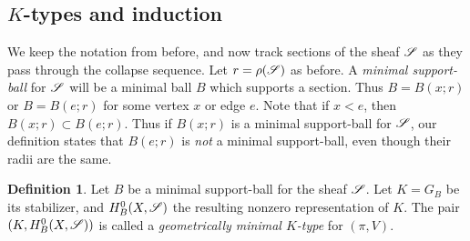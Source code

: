 \documentclass[letter]{amsart}
\theoremstyle{definition}
\newtheorem{definition}[thm]{Definition}
\theoremstyle{remark}
\numberwithin{thm}{section}
\numberwithin{equation}{section}
\begin{document}
\subsection{$K$-types and induction}

We keep the notation from before, and now track sections of the sheaf ${\mathscr{S}}$ as they pass through the collapse sequence.  Let $r = \rho({\mathscr{S}})$ as before.  A {\em minimal support-ball} for ${\mathscr{S}}$ will be a minimal ball $B$ which supports a section.  Thus $B = B(x;r)$ or $B = B(e;r)$ for some vertex $x$ or edge $e$.  Note that if $x < e$, then $B(x;r) \subset B(e;r)$.  Thus if $B(x;r)$ is a minimal support-ball for ${\mathscr{S}}$, our definition states that $B(e;r)$ is {\em not} a minimal support-ball, even though their radii are the same.  

\begin{definition}
Let $B$ be a minimal support-ball for the sheaf ${\mathscr{S}}$.  Let $K = G_B$ be its stabilizer, and $H_B^0(X, {\mathscr{S}})$ the resulting nonzero representation of $K$.  The pair $(K, H_B^0(X, {\mathscr{S}}))$ is called a {\em geometrically minimal $K$-type} for $(\pi, V)$.
\end{definition}
\end{document}
